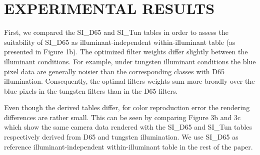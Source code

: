 \documentclass[]{spie}
\begin{document}
\begin{figure}
\begin{center}
\label{fig:natureBasedChart}
\end{center}
\end{figure}



\section{EXPERIMENTAL RESULTS}

First, we compared the SI\_D65 and SI\_Tun tables in order to assess the suitability of SI\_D65 as illuminant-independent within-illuminant table (as presented in Figure 1b). The optimized filter weights differ slightly between the illuminant conditions. For example, under tungsten illuminant conditions the blue pixel data are generally noisier than the corresponding classes with D65 illumination. Consequently, the optimal filters weights sum more broadly over the blue pixels in the tungsten filters than in the D65 filters.

Even though the derived tables differ, for color reproduction error the rendering differences are rather small.  This can be seen by comparing Figure 3b and 3c which show the same camera data rendered with the SI\_D65 and SI\_Tun tables respectively derived from D65 and tungsten illumination. We use SI\_D65 as reference illuminant-independent within-illuminant table in the rest of the paper. 
\end{document}
